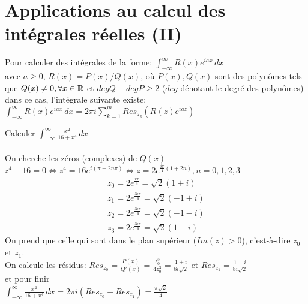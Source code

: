 \section{Applications au calcul des intégrales réelles (II)}
\begin{myProperty}
	Pour calculer des intégrales de la forme: $\int_{-\infty}^{\infty} R(x)e^{iax}\,dx$
	\\ 
	avec $a\geq 0$, $R(x)=P(x)/Q(x)$, où $P(x), Q(x)$ sont des polynômes tels que $Q(x)\neq0, \forall x \in \mathbb{R}$ et $degQ-degP\geq2$ ($deg$ dénotant le degré des polynômes)
	\\
	dans ce cas, l'intégrale suivante existe:
	\\
	$\int_{-\infty}^{\infty}R(x)e^{iax}\,dx=2\pi i\sum_{k=1}^{m}Res_{z_{k}}(R(z)e^{iaz})$
\end{myProperty}

\begin{myExample}
	Calculer $\int_{-\infty}^{\infty}\frac{x^2}{16+x^4}\,dx$
	\\\\
	On cherche les zéros (complexes) de $Q(x)$
	\\
	$z^4+16=0 \Leftrightarrow z^4=16e^{i(\pi+2n\pi)} \Leftrightarrow z=2e^{\frac{i\pi}{4}(1+2n)}, n=0,1,2,3$
	\begin{eqnarray*}
		z_0=2e^{\frac{i\pi}{4}}=\sqrt{2}(1+i)
		\\
		z_1=2e^{\frac{3i\pi}{4}}=\sqrt{2}(-1+i)
		\\
		z_2=2e^{\frac{3i\pi}{4}}=\sqrt{2}(-1-i)
		\\
		z_3=2e^{\frac{3i\pi}{4}}=\sqrt{2}(1-i)
	\end{eqnarray*}
	On prend que celle qui sont dans le plan supérieur ($Im(z)>0$), c'est-à-dire $z_0$ et $z_1$.
	\\
	On calcule les résidus: $Res_{z_{0}}=\frac{P(x)}{Q'(x)}=\frac{z_{0}^2}{4z_0^3}=\frac{1+i}{8i\sqrt{2}}$ et $Res_{z_{1}}=\frac{1-i}{8i\sqrt{2}}$
	\\
	et pour finir
	\\
	$\int_{-\infty}^{\infty}\frac{x^2}{16+x^4}\,dx=2\pi i(Res_{z_{0}}+Res_{z_{1}})=\frac{\pi\sqrt{2}}{4}$
\end{myExample}